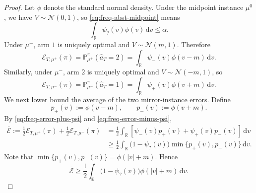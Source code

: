 \documentclass[10pt]{article}
\newcommand{\dd}{\mathrm{d}}
\theoremstyle{plain}
\begin{document}
\begin{proof}
Let $\phi$ denote the standard normal density. Under the midpoint instance
$\mu^0$, we have $V\sim\mathcal N(0,1)$, so
\eqref{eq:freq-abst-midpoint} means
\begin{equation}
\label{eq:freq-psi-abstention}
    \int_{\mathbb R}\psi_?(v)\phi(v)\,\dd v\le \alpha .
\end{equation}
Under $\mu^+$, arm $1$ is uniquely optimal and $V\sim\mathcal N(m,1)$.
Therefore
\begin{equation}
\label{eq:freq-error-plus-psi}
    \mathcal E_{T,\mu^+}(\pi)
    =
    \mathbb P_{\mu^+}^\pi(\hat a_T=2)
    =
    \int_{\mathbb R}\psi_-(v)\phi(v-m)\,\dd v .
\end{equation}
Similarly, under $\mu^-$, arm $2$ is uniquely optimal and
$V\sim\mathcal N(-m,1)$, so
\begin{equation}
\label{eq:freq-error-minus-psi}
    \mathcal E_{T,\mu^-}(\pi)
    =
    \mathbb P_{\mu^-}^\pi(\hat a_T=1)
    =
    \int_{\mathbb R}\psi_+(v)\phi(v+m)\,\dd v .
\end{equation}
We next lower bound the average of the two mirror-instance errors. Define
\[
    p_+(v):=\phi(v-m),
    \qquad
    p_-(v):=\phi(v+m).
\]
By \eqref{eq:freq-error-plus-psi} and \eqref{eq:freq-error-minus-psi},
$$
\begin{aligned}
    \overline{\mathcal E}
    :=
    \frac12\mathcal E_{T,\mu^+}(\pi)
    +
    \frac12\mathcal E_{T,\mu^-}(\pi)
    &=
    \frac12
    \int_{\mathbb R}
    \left[
        \psi_-(v)p_+(v)
        +
        \psi_+(v)p_-(v)
    \right]\,\dd v \\
    &\ge
    \frac12
    \int_{\mathbb R}
    \bigl(1-\psi_?(v)\bigr)
    \min\{p_+(v),p_-(v)\}\,\dd v .
\end{aligned}
$$
Note that
$
    \min\{p_+(v),p_-(v)\}
    =
    \phi(|v|+m)
$. Hence
\begin{equation}
\label{eq:freq-average-error-phi}
    \overline{\mathcal E}
    \ge
    \frac12
    \int_{\mathbb R}
    \bigl(1-\psi_?(v)\bigr)\phi(|v|+m)\,\dd v .
\end{equation}


\end{proof}
\end{document}
